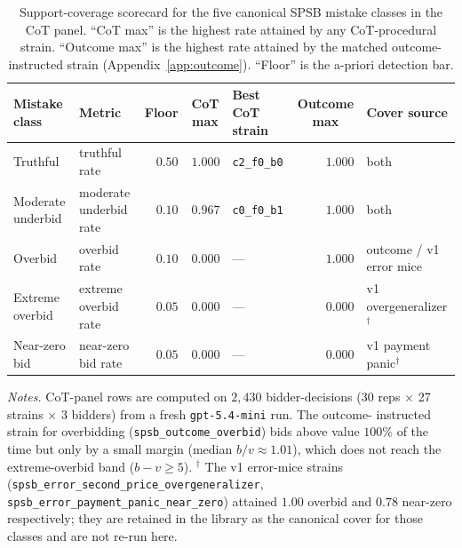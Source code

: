 \documentclass[12pt]{article}
\newcommand{\SPSB}{SPSB}
\begin{document}
\begin{table}[t]
\centering
\caption{Support-coverage scorecard for the five canonical \SPSB{}
mistake classes in the CoT panel. ``CoT max'' is the highest rate
attained by any CoT-procedural strain. ``Outcome max'' is the highest
rate attained by the matched outcome-instructed strain
(Appendix~\ref{app:outcome}). ``Floor'' is the a-priori detection
bar.}
\label{tab:calibration}
\footnotesize
\setlength{\tabcolsep}{3.5pt}
\begin{tabular}{@{}llrrlrl@{}}
\toprule
Mistake class & Metric & \multicolumn{1}{c}{Floor} & \multicolumn{1}{c}{CoT max} & Best CoT strain & \multicolumn{1}{c}{Outcome max} & Cover source \\
\midrule
Truthful         & truthful rate           & $0.50$ & $1.000$ & \texttt{c2\_f0\_b0} & $1.000$ & both \\
Moderate underbid& moderate underbid rate  & $0.10$ & $0.967$ & \texttt{c0\_f0\_b1} & $1.000$ & both \\
Overbid          & overbid rate            & $0.10$ & $0.000$ & ---                 & $1.000$ & outcome / v1 error mice \\
Extreme overbid  & extreme overbid rate    & $0.05$ & $0.000$ & ---                 & $0.000$ & v1 overgeneralizer$^\dagger$ \\
Near-zero bid    & near-zero bid rate      & $0.05$ & $0.000$ & ---                 & $0.000$ & v1 payment panic$^\dagger$ \\
\bottomrule
\end{tabular}

\vspace{0.4em}
\begin{minipage}{0.95\textwidth}
{\footnotesize\textit{Notes.} CoT-panel rows are computed on
$2{,}430$ bidder-decisions (30 reps $\times$ 27 strains $\times$ 3
bidders) from a fresh \texttt{gpt-5.4-mini} run. The outcome-
instructed strain for overbidding (\texttt{spsb\_outcome\_overbid})
bids above value $100\%$ of the time but only by a small margin
(median $b/v\approx 1.01$), which does not reach the extreme-overbid
band ($b-v\ge 5$). $^\dagger$ The v1 error-mice strains
(\texttt{spsb\_error\_second\_price\_overgeneralizer},
\texttt{spsb\_error\_payment\_panic\_near\_zero}) attained $1.00$
overbid and $0.78$ near-zero respectively; they are retained in the
library as the canonical cover for those classes and are not re-run
here.\par}
\end{minipage}
\end{table}
\end{document}
